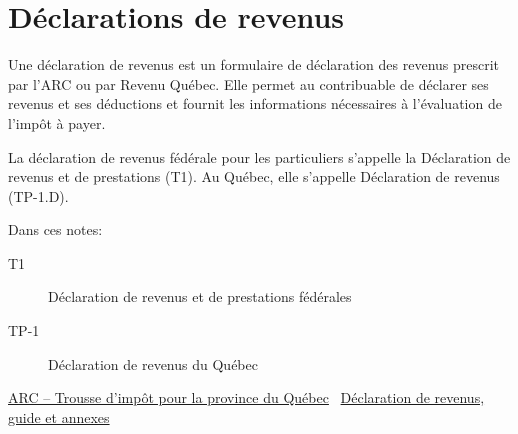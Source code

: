 \section{Déclarations de revenus}
\begin{intro}
	Une déclaration de revenus est un formulaire de déclaration des revenus prescrit par l'ARC ou par Revenu Québec. Elle permet au contribuable de déclarer ses revenus et ses déductions et fournit les informations nécessaires à l'évaluation de l'impôt à payer. 
	
	La déclaration de revenus fédérale pour les particuliers s'appelle la Déclaration de revenus et de prestations (T1). Au Québec, elle s'appelle Déclaration de revenus (TP-1.D).
\end{intro}
\begin{note}
	Dans ces notes:
	\begin{description}
		\item[T1] Déclaration de revenus et de prestations fédérales
		\item[TP-1] Déclaration de revenus du Québec
	\end{description}
\end{note}
\cat\href{https://www.canada.ca/fr/agence-revenu/services/formulaires-publications/trousses-impot-toutes-annees-imposition/trousse-generale-impot-prestations/quebec.html}{ARC -- Trousse d'impôt pour la province du Québec}
\
\qct\href{https://www.revenuquebec.ca/fr/services-en-ligne/formulaires-et-publications/details-courant/tp-1/}{Déclaration de revenus, guide et annexes}



